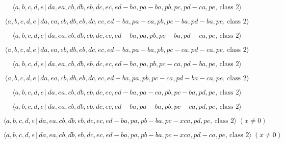 \documentclass[10pt]{article}
\begin{document}
\begin{equation}
\langle a,b,c,d,e\,|\,da,ea,cb,db,eb,dc,ec,ed-ba,pa-ba,pb,pc,pd-ca,pe,\,%
\text{class }2\rangle  \tag{7.4676}
\end{equation}

\begin{equation}
\langle a,b,c,d,e\,|\,da,ea,cb,db,eb,dc,ec,ed-ba,pa-ca,pb,pc-ba,pd-ba,pe,\,%
\text{class }2\rangle  \tag{7.4677}
\end{equation}

\begin{equation}
\langle a,b,c,d,e\,|\,da,ea,cb,db,eb,dc,ec,ed-ba,pa,pb,pc-ba,pd-ca,pe,\,%
\text{class }2\rangle  \tag{7.4678}
\end{equation}

\begin{equation}
\langle a,b,c,d,e\,|\,da,ea,cb,db,eb,dc,ec,ed-ba,pa-ba,pb,pc-ca,pd-ca,pe,\,%
\text{class }2\rangle  \tag{7.4679}
\end{equation}

\begin{equation}
\langle a,b,c,d,e\,|\,da,ea,cb,db,eb,dc,ec,ed-ba,pa,pb,pc-ca,pd-ba,pe,\,%
\text{class }2\rangle  \tag{7.4680}
\end{equation}

\begin{equation}
\langle a,b,c,d,e\,|\,da,ea,cb,db,eb,dc,ec,ed-ba,pa,pb,pc-ca,pd-ba-ca,pe,\,%
\text{class }2\rangle  \tag{7.4681}
\end{equation}

\begin{equation}
\langle a,b,c,d,e\,|\,da,ea,cb,db,eb,dc,ec,ed-ba,pa-ca,pb,pc-ba,pd,pe,\,%
\text{class }2\rangle  \tag{7.4682}
\end{equation}

\begin{equation}
\langle a,b,c,d,e\,|\,da,ea,cb,db,eb,dc,ec,ed-ba,pa-ba,pb,pc-ca,pd,pe,\,%
\text{class }2\rangle  \tag{7.4683}
\end{equation}

\begin{equation}
\langle a,b,c,d,e\,|\,da,ea,cb,db,eb,dc,ec,ed-ba,pa,pb-ba,pc-xca,pd,pe,\,%
\text{class }2\rangle \;(x \neq 0)  \tag{7.4684}
\end{equation}

\begin{equation}
\langle a,b,c,d,e\,|\,da,ea,cb,db,eb,dc,ec,ed-ba,pa,pb-ba,pc-xca,pd-ca,pe,\,%
\text{class }2\rangle \;(x \neq 0)  \tag{7.4685}
\end{equation}
\end{document}
